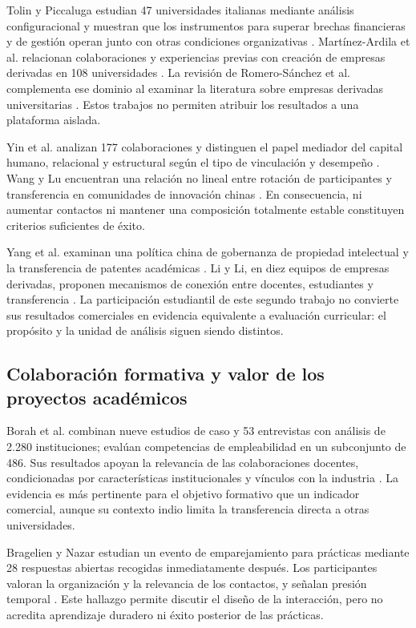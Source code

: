 \documentclass[12pt,twocolumn]{article}
\begin{document}
Tolin y Piccaluga estudian 47 universidades italianas mediante análisis configuracional y muestran que los instrumentos para superar brechas financieras y de gestión operan junto con otras condiciones organizativas \cite{tolin2025}. Martínez-Ardila et al. relacionan colaboraciones y experiencias previas con creación de empresas derivadas en 108 universidades \cite{martinez2023}. La revisión de Romero-Sánchez et al. complementa ese dominio al examinar la literatura sobre empresas derivadas universitarias \cite{romerosanchez2024}. Estos trabajos no permiten atribuir los resultados a una plataforma aislada.

Yin et al. analizan 177 colaboraciones y distinguen el papel mediador del capital humano, relacional y estructural según el tipo de vinculación y desempeño \cite{yin2023}. Wang y Lu encuentran una relación no lineal entre rotación de participantes y transferencia en comunidades de innovación chinas \cite{wang2021}. En consecuencia, ni aumentar contactos ni mantener una composición totalmente estable constituyen criterios suficientes de éxito.

Yang et al. examinan una política china de gobernanza de propiedad intelectual y la transferencia de patentes académicas \cite{yang2025}. Li y Li, en diez equipos de empresas derivadas, proponen mecanismos de conexión entre docentes, estudiantes y transferencia \cite{li2026}. La participación estudiantil de este segundo trabajo no convierte sus resultados comerciales en evidencia equivalente a evaluación curricular: el propósito y la unidad de análisis siguen siendo distintos.

\subsection{Colaboración formativa y valor de los proyectos académicos}
Borah et al. combinan nueve estudios de caso y 53 entrevistas con análisis de 2.280 instituciones; evalúan competencias de empleabilidad en un subconjunto de 486. Sus resultados apoyan la relevancia de las colaboraciones docentes, condicionadas por características institucionales y vínculos con la industria \cite{borah2021}. La evidencia es más pertinente para el objetivo formativo que un indicador comercial, aunque su contexto indio limita la transferencia directa a otras universidades.

Bragelien y Nazar estudian un evento de emparejamiento para prácticas mediante 28 respuestas abiertas recogidas inmediatamente después. Los participantes valoran la organización y la relevancia de los contactos, y señalan presión temporal \cite{bragelien2026}. Este hallazgo permite discutir el diseño de la interacción, pero no acredita aprendizaje duradero ni éxito posterior de las prácticas.
\end{document}
